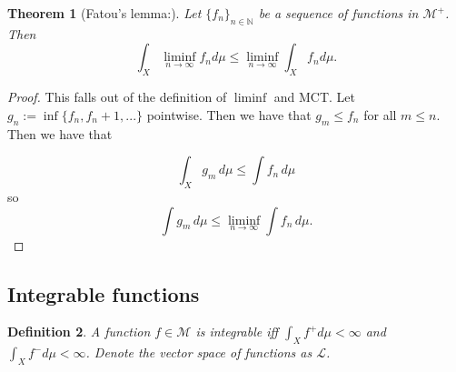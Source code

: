 \documentclass{article}
\newtheorem{theorem}{Theorem}
\newtheorem{definition}[theorem]{Definition}
\theoremstyle{definition}
\numberwithin{theorem}{section}
\numberwithin{equation}{section}
\begin{document}
\begin{theorem}[Fatou's lemma:]
	Let $\lbrace f_n \rbrace_{n \in \mathbb{N}}$ be a sequence of functions in $\mathcal{M}^+$. Then \begin{equation}
		\int_X \liminf_{n\rightarrow \infty} f_n d\mu \leq \liminf_{n \rightarrow \infty} \int_X f_n d\mu.
	\end{equation}
\end{theorem}
\begin{proof}
	This falls out of the definition of $\liminf$ and MCT.
		Let $g_n := \inf \{ f_n, f_n + 1, ...\}$ pointwise. Then we have that $g_m \leq f_n$ for all $m \leq n$. Then we have that 
	
	\begin{equation}
		\int_X g_m \, d\mu \leq \int f_n \, d\mu
	\end{equation}
	so 
	\begin{equation}
		\int g_m \, d\mu \leq \liminf_{n \rightarrow \infty} \int f_n \, d\mu.
	\end{equation}
	
\end{proof}

\subsection{Integrable functions}
\begin{definition}
	A function $f \in \mathcal{M}$ is integrable iff $\int_X f^+ d \mu < \infty$ and $\int_X f^- d \mu < \infty$. Denote the vector space of functions as $\mathcal{L}$. 
\end{definition}
\end{document}
